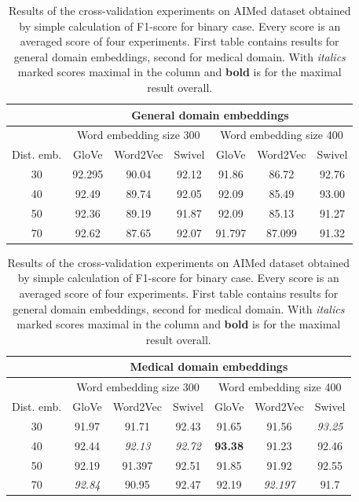 \begin{table}
        \centering
        \begin{tabular}{|c|c|c|c|c|c|c|}
          \hline
            & \multicolumn{6}{|c|}{General domain embeddings} \\\hline
            & \multicolumn{3}{|c|}{Word embedding size 300} & \multicolumn{3}{|c|}{Word embedding size 400} \\\hline
            Dist. emb. & GloVe & Word2Vec & Swivel & GloVe & Word2Vec & Swivel  \\\hline
            \multicolumn{1}{|c|}{30} & 92.295 & 90.04 & 92.12 & 91.86 & 86.72 & 92.76 \\\hline
            \multicolumn{1}{|c|}{40} & 92.49 & 89.74 & 92.05 & 92.09 & 85.49 & 93.00 \\\hline
            \multicolumn{1}{|c|}{50} & 92.36 & 89.19 & 91.87 & 92.09 & 85.13 & 91.27 \\\hline
            \multicolumn{1}{|c|}{70} & 92.62 & 87.65 & 92.07 & 91.797 & 87.099 & 91.32 \\\hline
        \end{tabular}
        
        \begin{tabular}{|c|c|c|c|c|c|c|}
          \hline
            & \multicolumn{6}{|c|}{Medical domain embeddings} \\\hline
            & \multicolumn{3}{|c|}{Word embedding size 300} & \multicolumn{3}{|c|}{Word embedding size 400} \\\hline
            Dist. emb. & GloVe & Word2Vec & Swivel & GloVe & Word2Vec & Swivel  \\\hline
            \multicolumn{1}{|c|}{30} & 91.97 & 91.71 & 92.43 & 91.65 & 91.56 & \textit{93.25} \\\hline
            \multicolumn{1}{|c|}{40} & 92.44 & \textit{92.13} & \textit{92.72} & \textbf{93.38} & 91.23 & 92.46 \\\hline
            \multicolumn{1}{|c|}{50} & 92.19 & 91.397 & 92.51 & 91.85 & 91.92 & 92.55 \\\hline
            \multicolumn{1}{|c|}{70} & \textit{92.84} & 90.95 & 92.47 & 92.19 & \textit{92.197} & 91.7 \\\hline
        \end{tabular}
        \caption[Cross-validation for the medical domain]{Results of the cross-validation experiments on AIMed dataset obtained by simple calculation of F1-score for binary case. Every score is an averaged score of four 
experiments. First table contains results for general domain embeddings, second for medical 
domain. With \textit{italics} marked scores maximal in the column and \textbf{bold} is for the 
maximal result overall.}
        \label{tab:val-aimed}
    \end{table}

